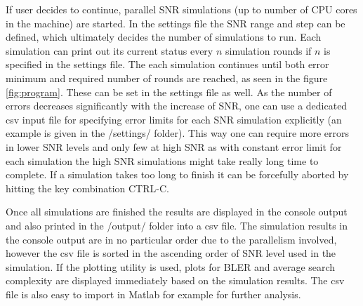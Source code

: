 \documentclass[english,12pt,a4paper,pdftex,sci,utf8]{aaltothesis}
\begin{document}
\par If user decides to continue, parallel SNR simulations (up to number of CPU cores in the machine) are started. In the settings file the SNR range and step can be defined, which ultimately decides the number of simulations to run. Each simulation can print out its current status every $n$ simulation rounds if $n$ is specified in the settings file. The each simulation continues until both error minimum and required number of rounds are reached, as seen in the figure \ref{fig:program}. These can be set in the settings file as well. As the number of errors decreases significantly with the increase of SNR, one can use a dedicated csv input file for specifying error limits for each SNR simulation explicitly (an example is given in the /settings/ folder). This way one can require more errors in lower SNR levels and only few at high SNR as with constant error limit for each simulation the high SNR simulations might take really long time to complete. If a simulation takes too long to finish it can be forcefully aborted by hitting the key combination CTRL-C.
\par Once all simulations are finished the results are displayed in the console output and also printed in the /output/ folder into a csv file. The simulation results in the console output are in no particular order due to the parallelism involved, however the csv file is sorted in the ascending order of SNR level used in the simulation. If the plotting utility is used, plots for BLER and average search complexity are displayed immediately based on the simulation results. The csv file is also easy to import in Matlab for example for further analysis. 
\end{document}
